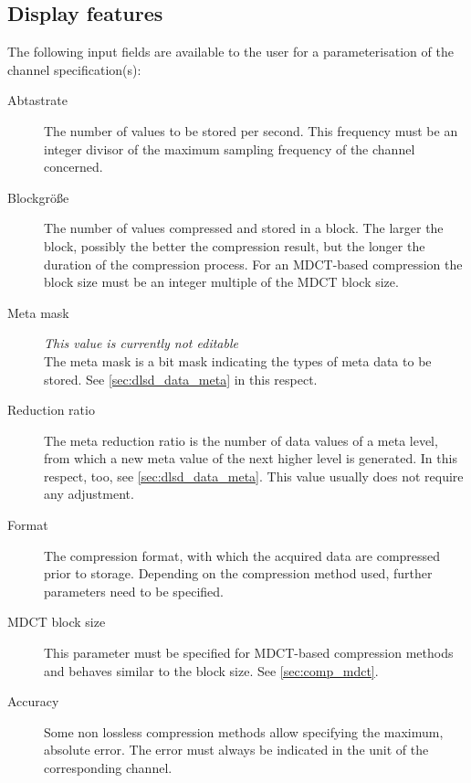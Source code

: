 \documentclass[a4paper,12pt,BCOR6mm,bibtotoc,idxtotoc]{scrbook}
\begin{document}

\subsection{Display features}

The following input fields are available to the user for a parameterisation of the channel specification(s):

\begin{description}

\item[Abtastrate] The number of values to be stored per second. This frequency
must be an integer divisor of the maximum sampling frequency of the channel
concerned.

\item[Blockgröße] The number of values compressed and stored in a block. The
larger the block, possibly the better the compression result, but the longer
the duration of the compression process. For an MDCT-based compression the
block size must be an integer multiple of the MDCT block size.

\item[Meta mask] \textit{This value is currently not editable}\\ The meta mask
is a bit mask indicating the types of meta data to be stored. See
\autoref{sec:dlsd_data_meta} in this respect.

\item[Reduction ratio] The meta reduction ratio is the number of data values
of a meta level, from which a new meta value of the next higher level is
generated. In this respect, too, see \autoref{sec:dlsd_data_meta}. This value
usually does not require any adjustment.

\item[Format] The compression format, with which the acquired data are
compressed prior to storage. Depending on the compression method used, further
parameters need to be specified.

\item[MDCT block size] This parameter must be specified for MDCT-based
compression methods and behaves similar to the block size. See
\autoref{sec:comp_mdct}.

\item[Accuracy]  Some non lossless compression methods allow specifying the
maximum, absolute error. The error must always be indicated in the unit of the
corresponding channel.

\end{description}
\end{document}
